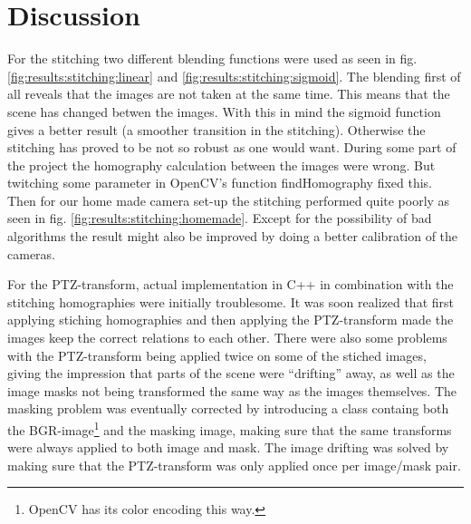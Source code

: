 \section{Discussion}
For the stitching two different blending functions were used as seen in fig. \ref{fig:results:stitching:linear} and \ref{fig:results:stitching:sigmoid}.
The blending first of all reveals that the images are not taken at the same time.
This means that the scene has changed betwen the images.
With this in mind the sigmoid function gives a better result (a smoother transition in the stitching).
Otherwise the stitching has proved to be not so robust as one would want.
During some part of the project the homography calculation between the images were wrong.
But twitching some parameter in OpenCV's function findHomography fixed this.
Then for our home made camera set-up the stitching performed quite poorly as seen in fig. \ref{fig:results:stitching:homemade}.
Except for the possibility of bad algorithms the result might also be improved by doing a better calibration of the cameras.

For the PTZ-transform, actual implementation in C++ in combination with the stitching homographies were initially troublesome.
It was soon realized that first applying stiching homographies and then applying the PTZ-transform made the images keep the correct relations to each other.
There were also some problems with the PTZ-transform being applied twice on some of the stiched images, giving the impression that parts of the scene were ``drifting'' away, as well as the image masks not being transformed the same way as the images themselves.
The masking problem was eventually corrected by introducing a class containg both the BGR-image\footnote{OpenCV has its color encoding this way.} and the masking image, making sure that the same transforms were always applied to both image and mask.
The image drifting was solved by making sure that the PTZ-transform was only applied once per image/mask pair.

